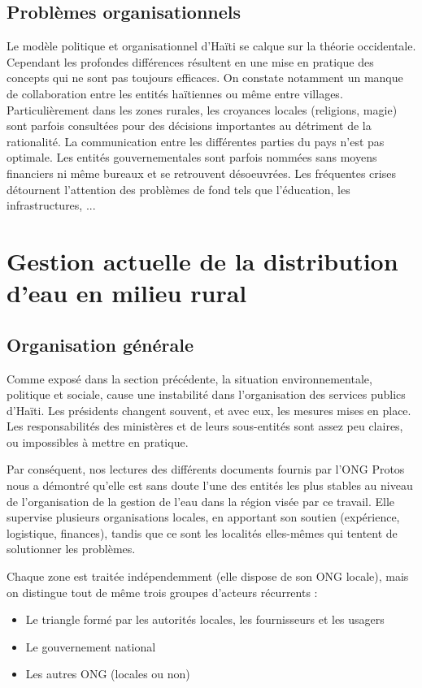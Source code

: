 \documentclass{EPL-master-thesis-covers-FR}
\begin{document}
			\subsection*{Problèmes organisationnels}
				Le modèle politique et organisationnel d'Haïti se calque sur la théorie occidentale. Cependant les profondes différences résultent en une mise en pratique des concepts qui ne sont pas toujours efficaces.
				On constate notamment un manque de collaboration entre les entités haïtiennes ou même entre villages. Particulièrement dans les zones rurales, les croyances locales (religions, magie) sont parfois consultées pour des décisions importantes au détriment de la rationalité. La communication entre les différentes parties du pays n'est pas optimale. Les entités gouvernementales sont parfois nommées sans moyens financiers ni même bureaux et se retrouvent désoeuvrées. Les fréquentes crises détournent l'attention des problèmes de fond tels que l'éducation, les infrastructures, ...

		\section{Gestion actuelle de la distribution d'eau en milieu rural}

			\subsection*{Organisation générale}

				Comme exposé dans la section précédente, la situation environnementale, politique et sociale, cause une instabilité dans l'organisation des services publics d'Haïti. Les présidents changent souvent, et avec eux, les mesures mises en place. Les responsabilités des ministères et de leurs sous-entités sont assez peu claires, ou impossibles à mettre en pratique.

				Par conséquent, nos lectures des différents documents fournis par l'ONG Protos nous a démontré qu'elle est sans doute l'une des entités les plus stables au niveau de l'organisation de la gestion de l'eau dans la région visée par ce travail. Elle supervise plusieurs organisations locales, en apportant son soutien (expérience, logistique, finances), tandis que ce sont les localités elles-mêmes qui tentent de solutionner les problèmes.

				Chaque zone est traitée indépendemment (elle dispose de son ONG locale), mais on distingue tout de même trois groupes d'acteurs récurrents :
				\begin{itemize}
					\item Le triangle formé par les autorités locales, les fournisseurs et les usagers
					\item Le gouvernement national
					\item Les autres ONG (locales ou non)
				\end{itemize}
\end{document}
